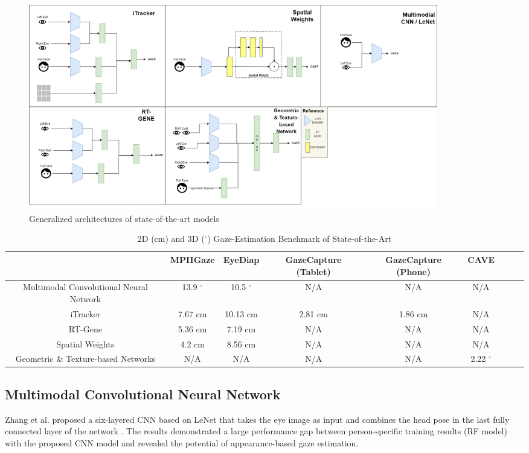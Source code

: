 \begin{figure}
    \centering
    \includegraphics[width=\textwidth,height=9cm]{img/figures/gaze-architectures.png}
    \caption{Generalized architectures of state-of-the-art models}
    \label{architectures_comparison}
 \end{figure}

 \begin{table}[h!]
    \caption[2D (cm) and 3D ($^{\circ}$) Gaze-Estimation Benchmark of State-of-the-Art]{2D (cm) and 3D ($^{\circ}$) Gaze-Estimation Benchmark of State-of-the-Art}
    \centering
    \label{tab:architectures}
    \begin{tabulary}{\textwidth}{CCCCCCCCC}
        \hline
         & MPIIGaze & EyeDiap & GazeCapture (Tablet) & GazeCapture (Phone) & CAVE \\\hline\hline
        Multimodal Convolutional Neural Network & 13.9 $^{\circ}$ & 10.5 $^{\circ}$ & N/A & N/A & N/A \\\hline
        iTracker & 7.67 cm & 10.13 cm & 2.81 cm & 1.86 cm & N/A & \\\hline
        RT-Gene & 5.36 cm & 7.19 cm & N/A & N/A & N/A \\\hline
        Spatial Weights & 4.2 cm & 8.56 cm & N/A & N/A & N/A\\\hline
        Geometric \& Texture-based Networks & N/A & N/A & N/A & N/A & 2.22 $^{\circ}$ \\\hline
        \end{tabulary}
\end{table}

\subsection{Multimodal Convolutional Neural Network}
Zhang et al. proposed a six-layered CNN based on LeNet that takes the eye image as input and combines the head pose in the last fully connected layer of the network \cite{GazeEstimationInTheWild}. The results demonstrated a large performance gap between person-specific training results (RF model) with the proposed CNN model and revealed the potential of appearance-based gaze estimation.

